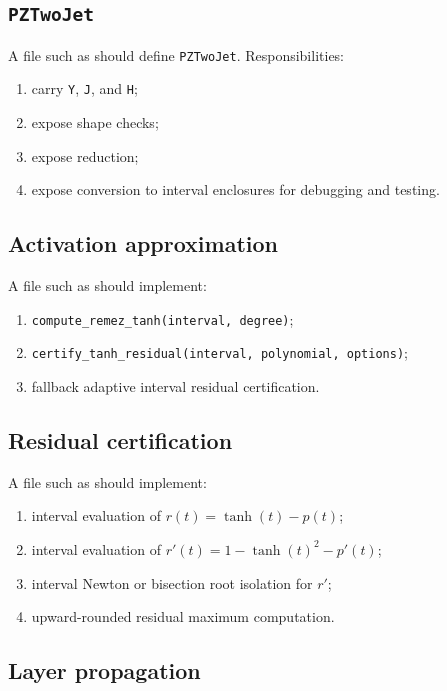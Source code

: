 \documentclass[11pt]{article}
\begin{document}
\subsection{\texttt{PZTwoJet}}

A file such as  should define \texttt{PZTwoJet}. Responsibilities:
\begin{enumerate}[label=(\roman*)]
    \item carry \texttt{Y}, \texttt{J}, and \texttt{H};
    \item expose shape checks;
    \item expose reduction;
    \item expose conversion to interval enclosures for debugging and testing.
\end{enumerate}

\subsection{Activation approximation}

A file such as  should implement:
\begin{enumerate}[label=(\roman*)]
    \item \texttt{compute\_remez\_tanh(interval, degree)};
    \item \texttt{certify\_tanh\_residual(interval, polynomial, options)};
    \item fallback adaptive interval residual certification.
\end{enumerate}

\subsection{Residual certification}

A file such as  should implement:
\begin{enumerate}[label=(\roman*)]
    \item interval evaluation of \(r(t)=\tanh(t)-p(t)\);
    \item interval evaluation of \(r'(t)=1-\tanh(t)^2-p'(t)\);
    \item interval Newton or bisection root isolation for \(r'\);
    \item upward-rounded residual maximum computation.
\end{enumerate}

\subsection{Layer propagation}
\end{document}
